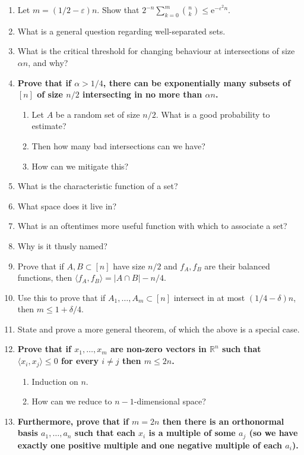 \documentclass[10pt]{article}
\renewcommand{\rm}[1]{\mathrm{#1}}
\newcommand{\bb}[1]{\mathbb{#1}}
\newcommand{\e}{\rm{e}}
\newcommand{\eps}{\varepsilon}
\newcommand{\R}{\bb{R}}
\begin{document}
\begin{enumerate}
    \item Let $m = (1/2 - \eps)n$. Show that $2^{-n}\sum_{k=0}^{m}{n\choose k} \le \e^{-\eps^2n}$.
    \item What is a general question regarding well-separated sets.
    \item What is the critical threshold for changing behaviour at intersections of size $\alpha n$, and why?
    \item \textbf{Prove that if $\alpha > 1/4$, there can be exponentially many subsets of $[n]$ of size $n/2$ intersecting in no more than $\alpha n$.}
    \begin{enumerate}
        \item Let $A$ be a random set of size $n/2$. What is a good probability to estimate?
        \item Then how many bad intersections can we have?
        \item How can we mitigate this?
    \end{enumerate}
    \item What is the characteristic function of a set?
    \item What space does it live in?
    \item What is an oftentimes more useful function with which to associate a set?
    \item Why is it thusly named?
    \item Prove that if $A,B\subset [n]$ have size $n/2$ and $f_A,f_B$ are their balanced functions, then $\langle f_A,f_B\rangle = |A\cap B| - n/4$.
    \item Use this to prove that if $A_1,\dots,A_m\subset [n]$ intersect in at most $(1/4 - \delta)n$, then $m \le 1 + \delta/4$.
    \item State and prove a more general theorem, of which the above is a special case.
    \item \textbf{Prove that if $x_1,\dots,x_m$ are non-zero vectors in $\R^n$ such that $\langle x_i,x_j\rangle\le 0$ for every $i\ne j$ then $m\le 2n$.}
    \begin{enumerate}
        \item Induction on $n$.
        \item How can we reduce to $n-1$-dimensional space?
    \end{enumerate}
    \item \textbf{Furthermore, prove that if $m = 2n$ then there is an orthonormal basis $a_1,\dots,a_n$ such that each $x_i$ is a multiple of some $a_j$ (so we have exactly one positive multiple and one negative multiple of each $a_i$).}

\end{enumerate}
\end{document}
